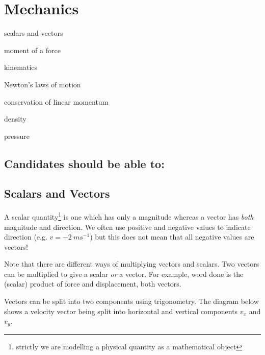 \documentclass[main.tex]{subfiles}
\begin{document}
\chapter{Mechanics}
\begin{content}
\item scalars and vectors
\item moment of a force
\item kinematics
\item Newton’s laws of motion
\item conservation of linear momentum
\item density
\item pressure
\end{content}

\section*{Candidates should be able to:}

\section{Scalars and Vectors}
A scalar quantity\footnote{strictly we are modelling a physical quantity as a mathematical object} is one which has only a magnitude whereas a vector has \emph{both} magnitude and direction. We often use positive and negative values to indicate direction (e.g. $v=-2\ ms^{-1}$) but this does not mean that all negative values are vectors!

Note that there are different ways of multiplying vectors and scalars. Two vectors can be multiplied to give a scalar \emph{or} a vector. For example, word done is the (scalar) product of force and displacement, both vectors.


Vectors can be split into two components using trigonometry. The diagram below shows a velocity vector being split into horizontal and vertical components $v_x$ and $v_y$.

\begin{figure}[h]
\begin{center}
\end{center}
\end{figure}
\end{document}
